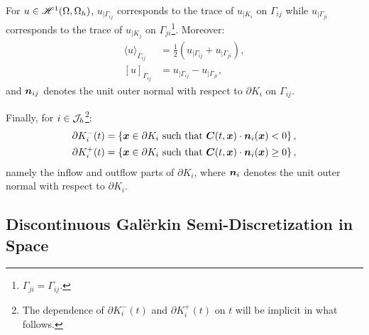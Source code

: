 For $u \in \mathscr{H}^{1}(\Omega, \Omega_h)$, $u_{\mid \Gamma_{ij}}$ corresponds to the trace of $u_{\mid K_i}$ on $\Gamma_{ij}$ while $u_{\mid \Gamma_{ji}}$ corresponds to the trace of $u_{\mid K_j}$ on $\Gamma_{ji}$\footnote{$\Gamma_{ji} = \Gamma_{ij}$.}. Moreover:
\begin{align}
    \langle u \rangle_{\Gamma_{ij}} &= \frac{1}{2} \left( u_{\mid \Gamma_{ij}} + u_{\mid \Gamma_{ji}} \right), \\
    \left[ u \right]_{\Gamma_{ij}} &= u_{\mid \Gamma_{ij}} - u_{\mid \Gamma_{ji}},
\end{align}
and $\bm{n}_{ij}$ denotes the unit outer normal with respect to $\partial K_i$ on $\Gamma_{ij}$.

Finally, for $i \in \mathcal{J}_h$\footnote{The dependence of $\partial K_i^-(t)$ and $\partial K_i^+(t)$ on $t$ will be implicit in what follows.}:
\begin{align}
    \partial K_i^-(t) = \left\{ \bm{x} \in \partial K_i \text{ such that } \bm{C}(t, \bm{x}) \cdot \bm{n}_i(\bm{x}) < 0 \right\}, \\
    \partial K_i^+(t) = \left\{ \bm{x} \in \partial K_i \text{ such that } \bm{C}(t, \bm{x}) \cdot \bm{n}_i(\bm{x}) \geq 0 \right\},
\end{align}
namely the inflow and outflow parts of $\partial K_i$, where $\bm{n}_i$ denotes the unit outer normal with respect to $\partial K_i$.

\newpage
\subsection{Discontinuous Galërkin Semi-Discretization in Space}

